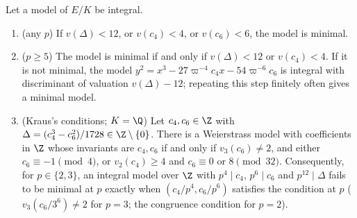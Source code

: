 \begin{proposition}\label{prop:reduction:min-criterion}
Let a model of $E/K$ be integral.
\begin{enumerate}[label=(\roman*)]
\item (any $p$) If $v(\Delta)<12$, or $v(c_4)<4$, or $v(c_6)<6$, the model is minimal.
\item ($p\ge5$) The model is minimal if and only if $v(\Delta)<12$ or $v(c_4)<4$. If it is not minimal, the
model $y^2=x^3-27\varpi^{-4}c_4x-54\varpi^{-6}c_6$ is integral with discriminant of valuation $v(\Delta)-12$;
repeating this step finitely often gives a minimal model.
\item (Kraus's conditions; $K=\Q$) Let $c_4,c_6\in\Z$ with $\Delta=(c_4^3-c_6^2)/1728\in\Z\setminus\{0\}$. There is a
Weierstrass model with coefficients in $\Z$ whose invariants are $c_4,c_6$ if and only if $v_3(c_6)\ne2$, and
either $c_6\equiv-1\pmod4$, or $v_2(c_4)\ge4$ and $c_6\equiv0$ or $8\pmod{32}$. Consequently, for
$p\in\{2,3\}$, an integral model over $\Z$ with $p^4\mid c_4$, $p^6\mid c_6$ and $p^{12}\mid\Delta$ fails to be
minimal at $p$ exactly when $(c_4/p^4,c_6/p^6)$ satisfies the condition at $p$ ($v_3(c_6/3^6)\ne2$ for $p=3$;
the congruence condition for $p=2$).
\end{enumerate}
\end{proposition}

